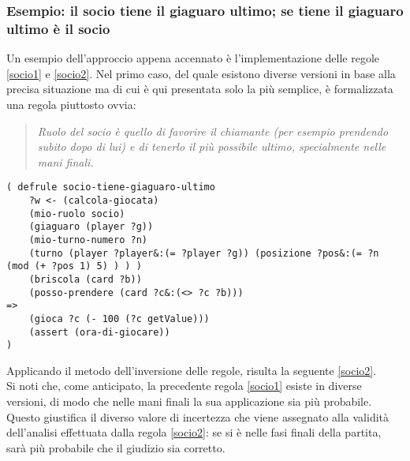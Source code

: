 
\subsubsection*{Esempio: il socio tiene il giaguaro ultimo; se tiene il giaguaro ultimo è il socio}
Un esempio dell'approccio appena accennato è l'implementazione delle regole \ref{socio1} e \ref{socio2}.
Nel primo caso, del quale esistono diverse versioni in base alla precisa situazione ma di cui è qui presentata solo la più semplice, è formalizzata una regola piuttosto ovvia:
\begin{quote}
\emph{Ruolo del socio è quello di favorire il chiamante (per esempio prendendo subito dopo di lui) e di tenerlo il più possibile ultimo, specialmente nelle mani finali.}
\end{quote}
\begin{lstlisting}[caption={Se sono il socio e gioco subito dopo di lui, se posso prendere senza palesarmi, prendo per lasciarlo ultimo la mano successiva},label=socio1]
( defrule socio-tiene-giaguaro-ultimo
    ?w <- (calcola-giocata)
    (mio-ruolo socio)
    (giaguaro (player ?g))
    (mio-turno-numero ?n)
    (turno (player ?player&:(= ?player ?g)) (posizione ?pos&:(= ?n (mod (+ ?pos 1) 5) ) ) )
    (briscola (card ?b))
    (posso-prendere (card ?c&:(<> ?c ?b)))
=>
    (gioca ?c (- 100 (?c getValue)))
    (assert (ora-di-giocare))
)
\end{lstlisting}
Applicando il metodo dell'inversione delle regole, risulta la seguente \ref{socio2}.\\
Si noti che, come anticipato, la precedente regola \ref{socio1} esiste in diverse versioni, di modo che nelle mani finali la sua applicazione sia più probabile. Questo giustifica il diverso valore di incertezza che viene assegnato alla validità dell'analisi effettuata dalla regola \ref{socio2}: se si è nelle fasi finali della partita, sarà più probabile che il giudizio sia corretto.



